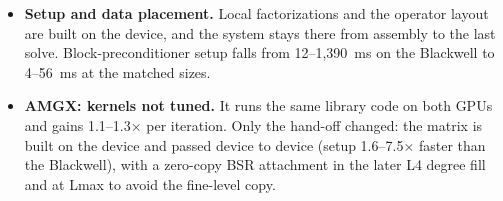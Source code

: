 \documentclass[10pt,a4paper]{article}
\begin{document}
\begin{itemize}
  the trigger to $\text{target}\cdot\beta/\|r\|$ and stops near the true target, which cuts iterations
  on 39 of the 71 matched configurations (ASM+PP, BJ+PP and $p$MG--AMG use it).
\item \textbf{Setup and data placement.} Local factorizations and the operator layout are built on
  the device, and the system stays there from assembly to the last solve. Block-preconditioner setup
  falls from 12--1{,}390~ms on the Blackwell to 4--56~ms at the matched sizes.
\item \textbf{AMGX: kernels not tuned.} It runs the same library code on both GPUs and gains
  1.1--1.3$\times$ per iteration. Only the hand-off changed: the matrix is built on the device and
  passed device to device (setup 1.6--7.5$\times$ faster than the Blackwell), with a zero-copy BSR attachment
  in the later L4 degree fill and at Lmax to avoid the fine-level copy.
\end{itemize}
\end{document}
